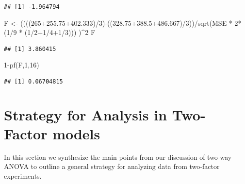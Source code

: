 \documentclass[
]{book}
\newenvironment{Shaded}{\begin{snugshade}}{\end{snugshade}}
\newcommand{\DecValTok}[1]{\textcolor[rgb]{0.00,0.00,0.81}{#1}}
\newcommand{\FloatTok}[1]{\textcolor[rgb]{0.00,0.00,0.81}{#1}}
\newcommand{\FunctionTok}[1]{\textcolor[rgb]{0.00,0.00,0.00}{#1}}
\newcommand{\NormalTok}[1]{#1}
\newcommand{\OtherTok}[1]{\textcolor[rgb]{0.56,0.35,0.01}{#1}}
\newcommand{\SpecialCharTok}[1]{\textcolor[rgb]{0.00,0.00,0.00}{#1}}
\begin{document}
\begin{verbatim}
## [1] -1.964794
\end{verbatim}

\begin{Shaded}
\begin{Highlighting}[]
\NormalTok{F }\OtherTok{\textless{}{-}}\NormalTok{ ((((}\DecValTok{265}\FloatTok{+255.75+402.333}\NormalTok{)}\SpecialCharTok{/}\DecValTok{3}\NormalTok{)}\SpecialCharTok{{-}}\NormalTok{((}\FloatTok{328.75+388.5+486.667}\NormalTok{)}\SpecialCharTok{/}\DecValTok{3}\NormalTok{))}\SpecialCharTok{/}\FunctionTok{sqrt}\NormalTok{(MSE }\SpecialCharTok{*} \DecValTok{2}\SpecialCharTok{*}\NormalTok{(}\DecValTok{1}\SpecialCharTok{/}\DecValTok{9} \SpecialCharTok{*}\NormalTok{ (}\DecValTok{1}\SpecialCharTok{/}\DecValTok{2}\SpecialCharTok{+}\DecValTok{1}\SpecialCharTok{/}\DecValTok{4}\SpecialCharTok{+}\DecValTok{1}\SpecialCharTok{/}\DecValTok{3}\NormalTok{)))}
\NormalTok{)}\SpecialCharTok{\^{}}\DecValTok{2}
\NormalTok{F}
\end{Highlighting}
\end{Shaded}

\begin{verbatim}
## [1] 3.860415
\end{verbatim}

\begin{Shaded}
\begin{Highlighting}[]
\DecValTok{1}\SpecialCharTok{{-}}\FunctionTok{pf}\NormalTok{(F,}\DecValTok{1}\NormalTok{,}\DecValTok{16}\NormalTok{)}
\end{Highlighting}
\end{Shaded}

\begin{verbatim}
## [1] 0.06704815
\end{verbatim}

\hypertarget{strategy-for-analysis-in-two-factor-models}{%
\chapter{Strategy for Analysis in Two-Factor models}\label{strategy-for-analysis-in-two-factor-models}}

In this section we synthesize the main points from our discussion of two-way ANOVA to outline a general strategy for analyzing data from two-factor experiments.
\end{document}
